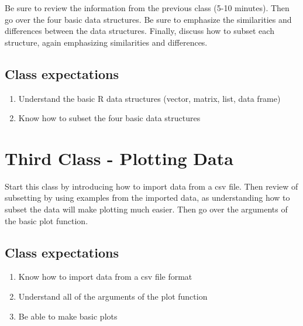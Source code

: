 \documentclass[paper=a4, fontsize=11pt]{scrartcl} %
\numberwithin{equation}{section} %
\numberwithin{figure}{section} %
\numberwithin{table}{section} %
\begin{document}
Be sure to review the information from the previous class (5-10 minutes). Then go over the four basic data structures. Be sure to emphasize the similarities and differences between the data structures. Finally, discuss how to subset each structure, again emphasizing similarities and differences. 


\subsection{Class expectations}

\begin{enumerate}
\item Understand the basic R data structures (vector, matrix, list, data frame)
\item Know how to subset the four basic data structures 
\end{enumerate}


\section{Third Class - Plotting Data}

Start this class by introducing how to import data from a csv file. Then review of subsetting by using examples from the imported data, as understanding how to subset the data will make plotting much easier. Then go over the arguments of the basic plot function.  


\subsection{Class expectations}

\begin{enumerate}
\item Know how to import data from a csv file format
\item Understand all of the arguments of the plot function
\item Be able to make basic plots  
\end{enumerate}

\end{document}
